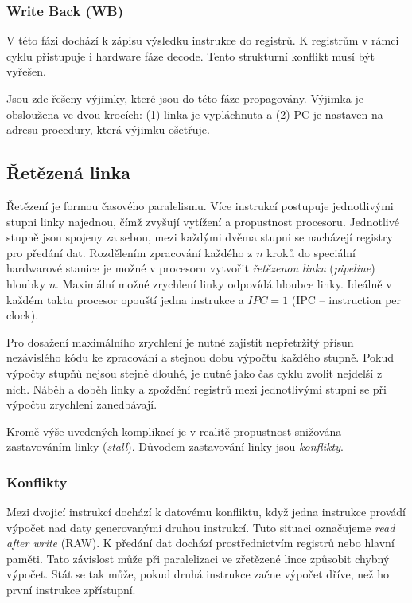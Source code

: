 \subsubsection{Write Back (WB)}

V této fázi dochází k zápisu výsledku instrukce do registrů.
K registrům v rámci cyklu přistupuje i hardware fáze decode.
Tento strukturní konflikt musí být vyřešen.

Jsou zde řešeny výjimky, které jsou do této fáze propagovány.
Výjimka je obsloužena ve dvou krocích: (1) linka je vypláchnuta a (2) PC je nastaven na adresu procedury, která výjimku ošetřuje.

\subsection{Řetězená linka}

Řetězení je formou časového paralelismu.
Více instrukcí postupuje jednotlivými stupni linky najednou, čímž zvyšují vytížení a propustnost procesoru.
Jednotlivé stupně jsou spojeny za sebou, mezi každými dvěma stupni se nacházejí registry pro předání dat.
Rozdělením zpracování každého z $n$ kroků do speciální hardwarové stanice je možné v procesoru vytvořit \emph{řetězenou linku} (\emph{pipeline}) hloubky $n$.
Maximální možné zrychlení linky odpovídá hloubce linky.
Ideálně v každém taktu procesor opouští jedna instrukce a $IPC = 1$ (IPC -- instruction per clock).

Pro dosažení maximálního zrychlení je nutné zajistit nepřetržitý přísun nezávislého kódu ke zpracování a stejnou dobu výpočtu každého stupně.
Pokud výpočty stupňů nejsou stejně dlouhé, je nutné jako čas cyklu zvolit nejdelší z nich.
Náběh a doběh linky a zpoždění registrů mezi jednotlivými stupni se při výpočtu zrychlení zanedbávají.

Kromě výše uvedených komplikací je v realitě propustnost snižována zastavováním linky (\emph{stall}).
Důvodem zastavování linky jsou \emph{konflikty}. \cite{OrganizationAndDesign}

\subsubsection{Konflikty}

Mezi dvojicí instrukcí dochází k datovému konfliktu, když jedna instrukce provádí výpočet nad daty generovanými druhou instrukcí.
Tuto situaci označujeme \emph{read after write} (RAW).
K předání dat dochází prostřednictvím registrů nebo hlavní paměti.
Tato závislost může při paralelizaci ve zřetězené lince způsobit chybný výpočet.
Stát se tak může, pokud druhá instrukce začne výpočet dříve, než ho první instrukce zpřístupní.

